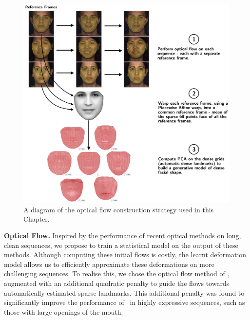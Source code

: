 \begin{figure}[t]
    \centering
    \includegraphics[width=\textwidth]{face_flow/images/of_pca_basis/optical_flow_basis_construction}
    \caption{A diagram of the optical flow construction strategy used in this
             Chapter.}
\label{fig:optical_flow_pca_basis_construction}
\end{figure}
\textbf{Optical Flow.}
Inspired by the performance of recent optical methods on long, clean sequences,
we propose to train a statistical model on the output of these methods. 
Although computing these initial flows is costly, the learnt deformation model
allows us to efficiently approximate these deformations on more challenging
sequences. To realise this, we chose the optical flow method of
\citet{garg2013variational}, augmented with an additional quadratic penalty
to guide the flows towards automatically estimated sparse landmarks.
This additional penalty was found to significantly improve the performance
of~\cite{garg2013variational} in highly expressive sequences, such as those with 
large openings of the mouth.

